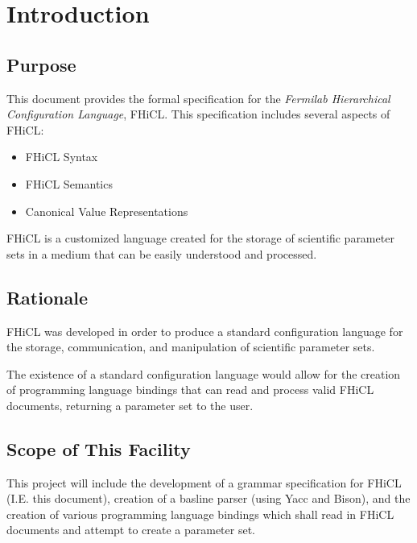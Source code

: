 \documentclass{memarticle}
\begin{document}
\topmatter
\newpage
\setlength{\parindent}{0in}

\chapter{Introduction}
        \section{Purpose}
        {
                This document provides the formal specification
                for the \emph{Fermilab Hierarchical Configuration Language}, FHiCL.
                This specification includes several aspects of FHiCL:
                \begin{itemize}
                        \item FHiCL Syntax
                        \item FHiCL Semantics
                        \item Canonical Value Representations
                \end{itemize}
                \par
                FHiCL is a customized language created for the storage of scientific parameter sets
                in a medium that can be easily understood and processed.
        }
        \section{Rationale}
        {
                FHiCL was developed in order to produce
                a standard configuration language for the storage,
                communication, 
                and manipulation
                of scientific parameter sets.
                \par
                The existence of a standard configuration language would allow for 
                the creation of programming language bindings that can read and process
                valid FHiCL documents, returning a parameter set to the user.
        }
        
        \section{Scope of This Facility}
        {
                This project will include the development of a grammar specification for FHiCL
                (I.E. this document), creation of a basline parser (using Yacc and Bison), and the
                creation of various programming language bindings which shall read in
                FHiCL documents and attempt to create a parameter set.
        }
        \newpage
\end{document}
